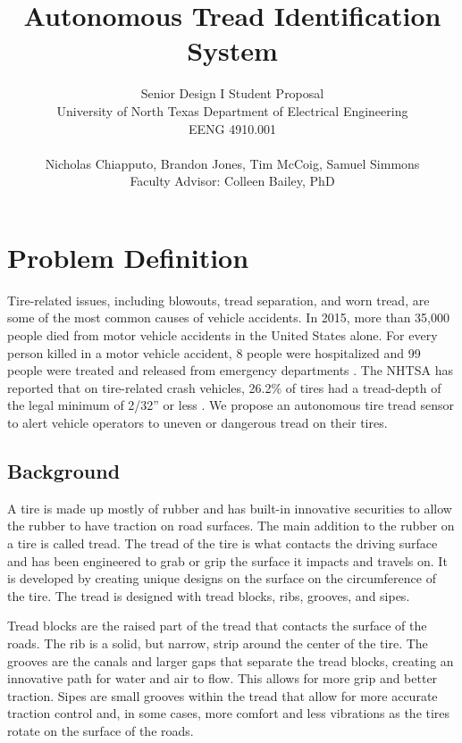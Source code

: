 \documentclass[11pt]{IEEEtran}
\begin{document}
	\title{ Autonomous Tread Identification System }

	\author{	Senior Design I Student Proposal \\
				University of North Texas Department of Electrical Engineering \\
				EENG 4910.001 \\ \\
				Nicholas Chiapputo, Brandon Jones, Tim McCoig, Samuel Simmons \\
				Faculty Advisor: Colleen Bailey, PhD
	}

	\maketitle


	\section{Problem Definition}
		Tire-related issues, including blowouts, tread separation, and worn tread, are some of the most common causes of vehicle accidents. In 2015, more than 35,000 people died from motor vehicle accidents in the United States alone. For every person killed in a motor vehicle accident, 8 people were hospitalized and 99 people were treated and released from emergency departments \cite{cdcKeyStats}. The NHTSA has reported that on tire-related crash vehicles, 26.2\% of tires had a tread-depth of the legal minimum of 2/32'' or less \cite[pp.~8-9]{nhtsaCrashStats}. We propose an autonomous tire tread sensor to alert vehicle operators to uneven or dangerous tread on their tires.

		\subsection{Background}
			A tire is made up mostly of rubber and has built-in innovative securities to allow the rubber to have traction on road surfaces. The main addition to the rubber on a tire is called tread. The tread of the tire is what contacts the driving surface and has been engineered to grab or grip the surface it impacts and travels on. It is developed by creating unique designs on the surface on the circumference of the tire. The tread is designed with tread blocks, ribs, grooves, and sipes.

			Tread blocks are the raised part of the tread that contacts the surface of the roads. The rib is a solid, but narrow, strip around the center of the tire. The grooves are the canals and larger gaps that separate the tread blocks, creating an innovative path for water and air to flow. This allows for more grip and better traction. Sipes are small grooves within the tread that allow for more accurate traction control and, in some cases, more comfort and less vibrations as the tires rotate on the surface of the roads. 
\end{document}

